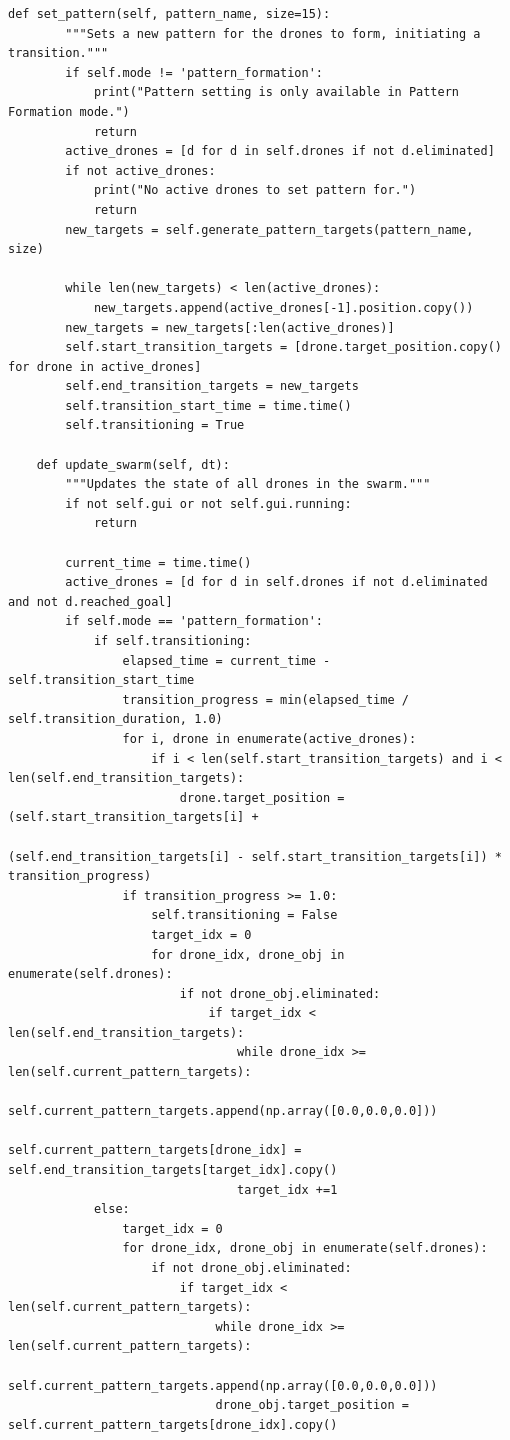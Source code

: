 \documentclass[11pt]{article}
\begin{document}
\begin{lstlisting}[style=pythonstyle]
    def set_pattern(self, pattern_name, size=15):
        """Sets a new pattern for the drones to form, initiating a transition."""
        if self.mode != 'pattern_formation':
            print("Pattern setting is only available in Pattern Formation mode.")
            return
        active_drones = [d for d in self.drones if not d.eliminated]
        if not active_drones:
            print("No active drones to set pattern for.")
            return
        new_targets = self.generate_pattern_targets(pattern_name, size)

        while len(new_targets) < len(active_drones):
            new_targets.append(active_drones[-1].position.copy())
        new_targets = new_targets[:len(active_drones)]
        self.start_transition_targets = [drone.target_position.copy() for drone in active_drones]
        self.end_transition_targets = new_targets
        self.transition_start_time = time.time()
        self.transitioning = True

    def update_swarm(self, dt):
        """Updates the state of all drones in the swarm."""
        if not self.gui or not self.gui.running:
            return

        current_time = time.time()
        active_drones = [d for d in self.drones if not d.eliminated and not d.reached_goal]
        if self.mode == 'pattern_formation':
            if self.transitioning:
                elapsed_time = current_time - self.transition_start_time
                transition_progress = min(elapsed_time / self.transition_duration, 1.0)
                for i, drone in enumerate(active_drones):
                    if i < len(self.start_transition_targets) and i < len(self.end_transition_targets):
                        drone.target_position = (self.start_transition_targets[i] +
                                                 (self.end_transition_targets[i] - self.start_transition_targets[i]) * transition_progress)
                if transition_progress >= 1.0:
                    self.transitioning = False
                    target_idx = 0
                    for drone_idx, drone_obj in enumerate(self.drones):
                        if not drone_obj.eliminated:
                            if target_idx < len(self.end_transition_targets):
                                while drone_idx >= len(self.current_pattern_targets):
                                    self.current_pattern_targets.append(np.array([0.0,0.0,0.0]))
                                self.current_pattern_targets[drone_idx] = self.end_transition_targets[target_idx].copy()
                                target_idx +=1
            else:
                target_idx = 0
                for drone_idx, drone_obj in enumerate(self.drones):
                    if not drone_obj.eliminated:
                        if target_idx < len(self.current_pattern_targets):
                             while drone_idx >= len(self.current_pattern_targets):
                                 self.current_pattern_targets.append(np.array([0.0,0.0,0.0]))
                             drone_obj.target_position = self.current_pattern_targets[drone_idx].copy()



\end{lstlisting}
\end{document}

